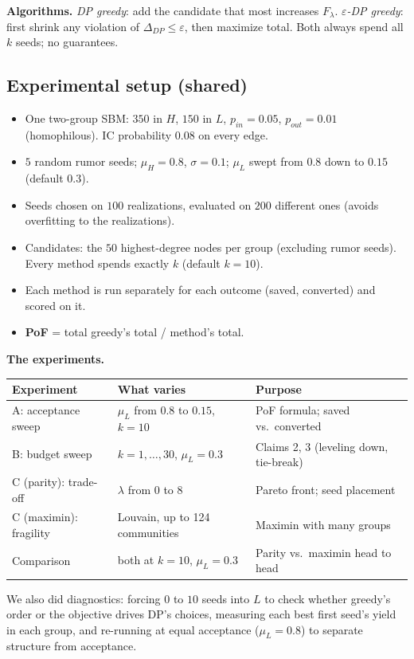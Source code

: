 \documentclass[11pt]{article}
\begin{document}
\textbf{Algorithms.} \emph{DP greedy}: add the candidate that most increases $F_\lambda$. \emph{$\varepsilon$-DP greedy}: first shrink any violation of $\Delta_{DP}\le\varepsilon$, then maximize total. Both always spend all $k$ seeds; no guarantees.

\subsection{Experimental setup (shared)}
\begin{itemize}
\item One two-group SBM: $350$ in $H$, $150$ in $L$, $p_{in}=0.05$, $p_{out}=0.01$ (homophilous). IC probability $0.08$ on every edge.
\item $5$ random rumor seeds; $\mu_H=0.8$, $\sigma=0.1$; $\mu_L$ swept from $0.8$ down to $0.15$ (default $0.3$).
\item Seeds chosen on $100$ realizations, evaluated on $200$ different ones (avoids overfitting to the realizations).
\item Candidates: the $50$ highest-degree nodes per group (excluding rumor seeds). Every method spends exactly $k$ (default $k=10$).
\item Each method is run separately for each outcome (saved, converted) and scored on it.
\item \textbf{PoF} = total greedy's total / method's total.
\end{itemize}

\textbf{The experiments.}
\begin{center}
\small
\begin{tabular}{lll}
\toprule
Experiment & What varies & Purpose \\
\midrule
A: acceptance sweep & $\mu_L$ from $0.8$ to $0.15$, $k=10$ & PoF formula; saved vs.\ converted \\
B: budget sweep & $k=1,\dots,30$, $\mu_L=0.3$ & Claims 2, 3 (leveling down, tie-break) \\
C (parity): trade-off & $\lambda$ from $0$ to $8$ & Pareto front; seed placement \\
C (maximin): fragility & Louvain, up to 124 communities & Maximin with many groups \\
Comparison & both at $k=10$, $\mu_L=0.3$ & Parity vs.\ maximin head to head \\
\bottomrule
\end{tabular}
\end{center}

We also did diagnostics: forcing $0$ to $10$ seeds into $L$ to check whether greedy's order or the objective drives DP's choices, measuring each best first seed's yield in each group, and re-running at equal acceptance ($\mu_L=0.8$) to separate structure from acceptance.
\end{document}
